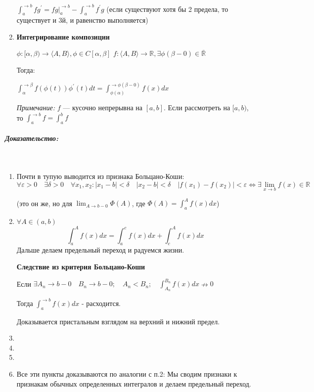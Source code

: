 \documentclass{article}
\let\vanillasubparagraph\subparagraph
\renewcommand{\subparagraph}[1]{\vanillasubparagraph{#1}\mbox{}\\}
\begin{document}
\begin{enumerate}
    $\int_a^{\rightarrow b}{fg^\prime} = fg|_a^{\rightarrow b} - \int_a^{\rightarrow b}{f^\prime g}$ (если существуют хотя бы 2 предела, то существует и 3й, и равенство выполняется)
    
    \item \textbf{Интегрирование композиции}
    
    $\phi: [\alpha, \beta) \rightarrow \langle A, B \rangle, \phi \in C[\alpha, \beta]$ 
    $f: \langle A, B \rangle \rightarrow \mathbb{R}, \exists \phi(\beta - 0) \in \overline{\mathbb{R}}$
    
    Тогда:
    
    $\int_\alpha^{\rightarrow \beta}{f(\phi(t))\phi^\prime(t)dt} =
     \int_{\phi(\alpha)}^{\rightarrow \phi(\beta - 0)}{f(x)dx}$
     
     \textit{Примечание:}
     $f$ --- кусочно непрерывна на $[a, b]$. Если рассмотреть на $[a, b)$, то $\int_a^{\rightarrow b}{f} = \int_a^b{f}$
    

\end{enumerate}

\subparagraph{Доказательство:}


\begin{enumerate}
    \item 
        Почти в тупую выводится из признака Больцано-Коши:
        $$
        \forall \varepsilon > 0 \quad \exists \delta > 0 \quad \forall x_1, x_2: |x_1 - b| < \delta \quad |x_2 - b| < \delta \quad |f(x_1) - f(x_2)| < \varepsilon \Leftrightarrow \exists \lim_{x\to b} f(x) \in \mathbb{R}
        $$

        (это он же, но для $\lim_{A\to b-0} \Phi(A)$, где $\Phi(A) = \int_a^A f(x) dx$)
    \item
        $\forall A \in (a, b)$
        $$
        \int_a^Af(x)dx = \int_a^c f(x)dx + \int_c^Af(x)dx
        $$
        Дальше делаем предельный переход и радуемся жизни.

        \textbf{Следствие из критерия Больцано-Коши}

        Если $\exists A_n \to b-0\quad B_n \to b-0; \quad A_n < B_n; \quad \int_{A_n}^{B_n}f(x)dx \nrightarrow 0$

        Тогда $\int_a^{\to b} f(x) dx$ - расходится. 

        Доказывается пристальным взглядом на верхний и нижний предел.
    \item 
    \item 
    \item 
    \item
        Все эти пункты доказываются по аналогии с п.2: Мы сводим признаки к признакам обычных определенных интегралов и делаем предельный переход. 
\end{enumerate}
\end{document}
